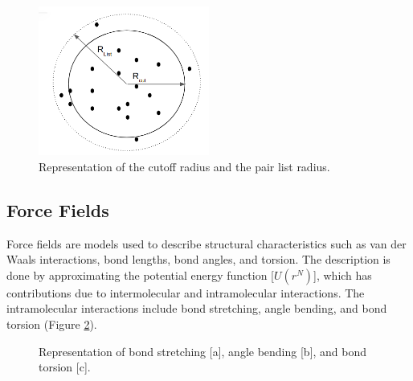 \begin{figure}
	\centering
	\includegraphics[width=0.5\textwidth]{Figures/pairlist}
	\caption{Representation of the cutoff radius and the pair list radius.}
	\label{fig:pairlist}
\end{figure}
\FloatBarrier
\subsection{Force Fields }
Force fields are models used to describe structural characteristics such as van der Waals interactions, bond lengths, bond angles, and torsion. The description is done by approximating the potential energy function [$U(r^N)$], which has contributions due to intermolecular and intramolecular interactions. The intramolecular interactions include bond stretching, angle bending, and bond torsion (Figure \ref{fig:intraint}). 

\begin{figure}[H]
	\centering
	\qquad
	\qquad
	\caption{Representation of bond stretching [a], angle bending [b], and bond torsion [c].}%
	\label{fig:intraint}%
\end{figure}


